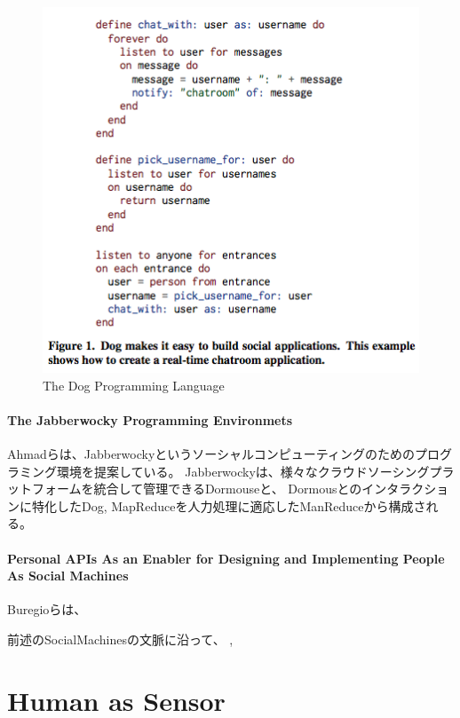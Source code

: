 \begin{figure}[htbp]
  \begin{center}
  \includegraphics[width=.6\linewidth,bb=0 0 426 414]{images/dog.png}
  \end{center}
  \caption{The Dog Programming Language}
  \label{fig:dog}
\end{figure}

\paragraph{The Jabberwocky Programming
Environmets}\label{the-jabberwocky-programming-environmets}

\mbox{}

Ahmadらは、Jabberwockyというソーシャルコンピューティングのためのプログラミング環境を提案している\cite{jabberwocky}。
Jabberwockyは、様々なクラウドソーシングプラットフォームを統合して管理できるDormouseと、
Dormousとのインタラクションに特化したDog,
MapReduceを人力処理に適応したManReduceから構成される。

\paragraph{Personal APIs As an Enabler for Designing and Implementing
People As Social
Machines}\label{personal-apis-as-an-enabler-for-designing-and-implementing-people-as-social-machines}

\mbox{}

Buregioらは、

前述のSocialMachinesの文脈に沿って、 \cite{personal-api},

\section{Human as Sensor}\label{human-as-sensor}

